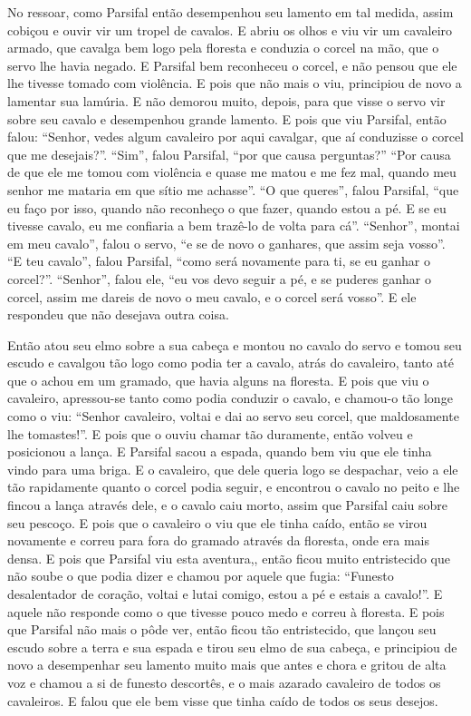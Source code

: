 No ressoar, como Parsifal então desempenhou seu lamento em tal medida,
assim cobiçou e ouvir vir um tropel de cavalos. E abriu os olhos e viu vir um
cavaleiro armado, que cavalga bem logo pela floresta e conduzia o corcel na
mão, que o servo lhe havia negado. E Parsifal bem reconheceu o corcel, e não
pensou que ele lhe tivesse tomado com violência. E pois que não mais o viu,
principiou de novo a lamentar sua lamúria. E não demorou muito, depois, para
que visse o servo vir sobre seu cavalo e desempenhou grande lamento. E pois que
viu Parsifal, então falou: “Senhor, vedes algum cavaleiro por aqui cavalgar,
que aí conduzisse o corcel que me desejais?”. “Sim”, falou Parsifal, “por que
causa perguntas?” “Por causa de que ele me tomou com violência e quase me matou
e me fez mal, quando meu senhor me mataria em que sítio me achasse”. “O que
queres”, falou Parsifal, “que eu faço por isso, quando não reconheço o que
fazer, quando estou a pé. E se eu tivesse cavalo, eu me confiaria a bem
trazê-lo de volta para cá”. “Senhor”, montai em meu cavalo”, falou o servo, “e
se de novo o ganhares, que assim seja vosso”. “E teu cavalo”, falou Parsifal,
“como será novamente para ti, se eu ganhar o corcel?”. “Senhor”, falou ele, “eu
vos devo seguir a pé, e se puderes ganhar o corcel, assim me dareis de novo o
meu cavalo, e o corcel será vosso”. E ele respondeu que não desejava outra
coisa. 

Então atou seu elmo sobre a sua cabeça e montou no cavalo do servo e tomou
seu escudo e cavalgou tão logo como podia ter a cavalo, atrás do cavaleiro,
tanto até que o achou em um gramado, que havia alguns na floresta. E pois que
viu o cavaleiro, apressou-se tanto como podia conduzir o cavalo, e chamou-o tão
longe como o viu: “Senhor cavaleiro, voltai e dai ao servo seu corcel, que
maldosamente lhe tomastes!”. E pois que o ouviu chamar tão
duramente, então volveu e posicionou a lança. E Parsifal sacou a espada,
quando bem viu que ele tinha vindo para uma briga. E o cavaleiro, que dele
queria logo se despachar, veio a ele tão rapidamente quanto o corcel podia
seguir, e encontrou o cavalo no peito e lhe fincou a lança através dele, e o
cavalo caiu morto, assim que Parsifal caiu sobre seu pescoço. E pois que o
cavaleiro o viu que ele tinha caído, então se virou novamente e correu para
fora do gramado através da floresta, onde era mais densa. E pois que Parsifal
viu esta aventura,, então ficou muito entristecido que não soube o que podia
dizer e chamou por aquele que fugia: “Funesto desalentador de coração, voltai e
lutai comigo, estou a pé e estais a cavalo!”. E aquele não responde como o que
tivesse pouco medo e correu à floresta. E pois que Parsifal não mais o pôde
ver, então ficou tão entristecido, que lançou seu escudo sobre a terra e sua
espada e tirou seu elmo de sua cabeça, e principiou de novo a desempenhar seu
lamento muito mais que antes e chora e gritou de alta voz e chamou a si de
funesto descortês, e o mais azarado cavaleiro de todos os cavaleiros.
E falou que ele bem visse que tinha caído de todos os seus desejos.

